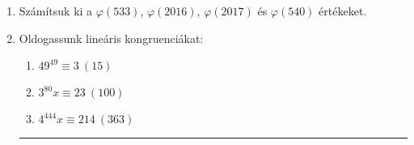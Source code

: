 \documentclass[a4paper, 12pt]{article}
\begin{document}
\begin{enumerate}
            \item Számítsuk ki a $\varphi(533)$, $\varphi(2016)$, $\varphi(2017)$ és $\varphi(540)$ értékeket.

            \item Oldogassunk lineáris kongruenciákat:
            \begin{multicols}{3}			
                \begin{enumerate}
                    \item $49^{49} \equiv 3 \ (15)$
                    \item $3^{80} x \equiv 23 \ (100)$
                    \item $4^{444} x \equiv 214 \ (363)$
                \end{enumerate}
            \end{multicols}

            \hrule


\end{enumerate}
\end{document}
